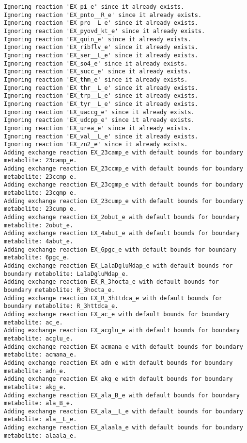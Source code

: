 \documentclass[
  letterpaper,
  DIV=11,
  numbers=noendperiod]{scrartcl}
\begin{document}
\begin{verbatim}
Ignoring reaction 'EX_pi_e' since it already exists.
Ignoring reaction 'EX_pnto__R_e' since it already exists.
Ignoring reaction 'EX_pro__L_e' since it already exists.
Ignoring reaction 'EX_pyovd_kt_e' since it already exists.
Ignoring reaction 'EX_quin_e' since it already exists.
Ignoring reaction 'EX_ribflv_e' since it already exists.
Ignoring reaction 'EX_ser__L_e' since it already exists.
Ignoring reaction 'EX_so4_e' since it already exists.
Ignoring reaction 'EX_succ_e' since it already exists.
Ignoring reaction 'EX_thm_e' since it already exists.
Ignoring reaction 'EX_thr__L_e' since it already exists.
Ignoring reaction 'EX_trp__L_e' since it already exists.
Ignoring reaction 'EX_tyr__L_e' since it already exists.
Ignoring reaction 'EX_uaccg_e' since it already exists.
Ignoring reaction 'EX_udcpp_e' since it already exists.
Ignoring reaction 'EX_urea_e' since it already exists.
Ignoring reaction 'EX_val__L_e' since it already exists.
Ignoring reaction 'EX_zn2_e' since it already exists.
Adding exchange reaction EX_23camp_e with default bounds for boundary metabolite: 23camp_e.
Adding exchange reaction EX_23ccmp_e with default bounds for boundary metabolite: 23ccmp_e.
Adding exchange reaction EX_23cgmp_e with default bounds for boundary metabolite: 23cgmp_e.
Adding exchange reaction EX_23cump_e with default bounds for boundary metabolite: 23cump_e.
Adding exchange reaction EX_2obut_e with default bounds for boundary metabolite: 2obut_e.
Adding exchange reaction EX_4abut_e with default bounds for boundary metabolite: 4abut_e.
Adding exchange reaction EX_6pgc_e with default bounds for boundary metabolite: 6pgc_e.
Adding exchange reaction EX_LalaDgluMdap_e with default bounds for boundary metabolite: LalaDgluMdap_e.
Adding exchange reaction EX_R_3hocta_e with default bounds for boundary metabolite: R_3hocta_e.
Adding exchange reaction EX_R_3httdca_e with default bounds for boundary metabolite: R_3httdca_e.
Adding exchange reaction EX_ac_e with default bounds for boundary metabolite: ac_e.
Adding exchange reaction EX_acglu_e with default bounds for boundary metabolite: acglu_e.
Adding exchange reaction EX_acmana_e with default bounds for boundary metabolite: acmana_e.
Adding exchange reaction EX_adn_e with default bounds for boundary metabolite: adn_e.
Adding exchange reaction EX_akg_e with default bounds for boundary metabolite: akg_e.
Adding exchange reaction EX_ala_B_e with default bounds for boundary metabolite: ala_B_e.
Adding exchange reaction EX_ala__L_e with default bounds for boundary metabolite: ala__L_e.
Adding exchange reaction EX_alaala_e with default bounds for boundary metabolite: alaala_e.

\end{verbatim}
\end{document}
